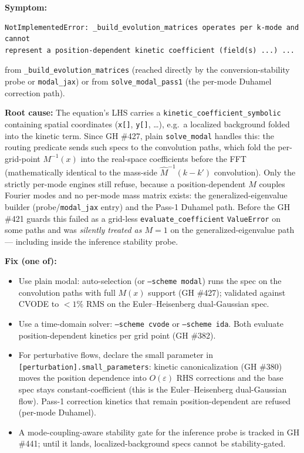 \textbf{Symptom:}
\begin{lstlisting}[style=python]
NotImplementedError: _build_evolution_matrices operates per k-mode and cannot
represent a position-dependent kinetic coefficient (field(s) ...) ...
\end{lstlisting}
from \texttt{\_build\_evolution\_matrices} (reached directly by the
conversion-stability probe or \texttt{modal\_jax}) or from
\texttt{solve\_modal\_pass1} (the per-mode Duhamel correction path).

\textbf{Root cause:} The equation's LHS carries a
\texttt{kinetic\_coefficient\_symbolic} containing spatial coordinates
(\texttt{x[]}, \texttt{y[]}, \dots), e.g.\ a localized background folded into the
kinetic term.  Since GH \#427, plain \texttt{solve\_modal} handles this: the
routing predicate sends such specs to the convolution paths, which fold the
per-grid-point $M^{-1}(x)$ into the real-space coefficients before the FFT
(mathematically identical to the mass-side $\hat{M}^{-1}(k-k')$ convolution).
Only the strictly per-mode engines still refuse, because a position-dependent
$M$ couples Fourier modes and no per-mode mass matrix exists: the
generalized-eigenvalue builder (probe/\texttt{modal\_jax} entry) and the Pass-1
Duhamel path.  Before the GH \#421 guards this failed as a grid-less
\texttt{evaluate\_coefficient} \texttt{ValueError} on some paths and was
\emph{silently treated as $M = 1$} on the generalized-eigenvalue path --- including
inside the inference stability probe.

\textbf{Fix (one of):}
\begin{itemize}
  \item Use plain modal: auto-selection (or \texttt{--scheme modal}) runs the
    spec on the convolution paths with full $M(x)$ support (GH \#427);
    validated against CVODE to $<1\%$ RMS on the Euler--Heisenberg
    dual-Gaussian spec.
  \item Use a time-domain solver: \texttt{--scheme cvode} or \texttt{--scheme ida}.
    Both evaluate position-dependent kinetics per grid point (GH \#382).
  \item For perturbative flows, declare the small parameter in
    \texttt{[perturbation].small\_parameters}: kinetic canonicalization
    (GH \#380) moves the position dependence into $O(\varepsilon)$ RHS
    corrections and the base spec stays constant-coefficient (this is the
    Euler--Heisenberg dual-Gaussian flow).  Pass-1 correction kinetics that
    remain position-dependent are refused (per-mode Duhamel).
  \item A mode-coupling-aware stability gate for the inference probe is
    tracked in GH \#441; until it lands, localized-background specs cannot be
    stability-gated.
\end{itemize}

